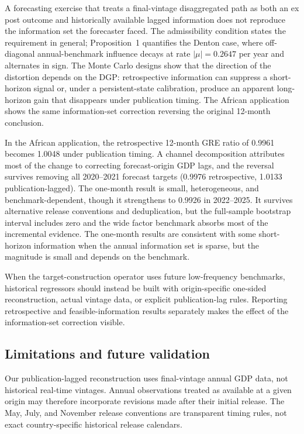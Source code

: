 \documentclass[preprint,12pt,authoryear]{elsarticle}
\begin{document}
A forecasting exercise that treats a final-vintage disaggregated path as
both an ex post outcome and historically available lagged information does not
reproduce the information set the forecaster faced. The admissibility condition
states the requirement in general; Proposition~1 quantifies the Denton case,
where off-diagonal annual-benchmark influence decays at rate
$|\mu| = 0.2647$ per year and alternates in sign. The Monte Carlo designs show
that the direction of the distortion depends on the DGP: retrospective
information can suppress a short-horizon signal or, under a persistent-state
calibration, produce an apparent long-horizon gain that disappears under
publication timing. The African application shows the same information-set
correction reversing the original 12-month conclusion.

In the African application, the retrospective 12-month GRE ratio of 0.9961
becomes 1.0048 under publication timing. A channel decomposition attributes
most of the change to correcting forecast-origin GDP lags, and the reversal
survives removing all 2020--2021 forecast targets (0.9976 retrospective,
1.0133 publication-lagged). The one-month result is small, heterogeneous, and
benchmark-dependent, though it strengthens to 0.9926 in 2022--2025. It
survives alternative release conventions and deduplication, but the full-sample
bootstrap interval includes zero and the wide factor benchmark absorbs most of
the incremental evidence. The one-month results are consistent with some short-horizon information when
the annual information set is sparse, but the magnitude is small and depends
on the benchmark.

When the target-construction operator uses future low-frequency benchmarks,
historical regressors should instead be built with origin-specific one-sided
reconstruction, actual vintage data, or explicit publication-lag rules.
Reporting retrospective and feasible-information results separately makes the
effect of the information-set correction visible.

\subsection{Limitations and future validation}

Our publication-lagged reconstruction uses final-vintage annual GDP data, not
historical real-time vintages. Annual observations treated as available at a
given origin may therefore incorporate revisions made after their initial
release. The May, July, and November release conventions are transparent
timing rules, not exact country-specific historical release calendars.
\end{document}
